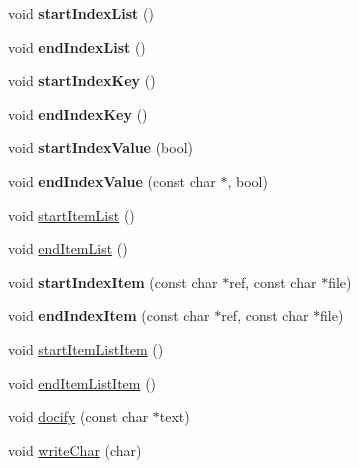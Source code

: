 \begin{DoxyCompactItemize}
void {\bfseries start\+Index\+List} ()
\item 
\mbox{\label{class_docbook_generator_af69c69875e18eba42abc65d88da3a8a5}} 
void {\bfseries end\+Index\+List} ()
\item 
\mbox{\label{class_docbook_generator_ac5012fc0e24ac8f1d65944ef72208311}} 
void {\bfseries start\+Index\+Key} ()
\item 
\mbox{\label{class_docbook_generator_af882cc6b2978a2eea0a83c8e59a5f0ee}} 
void {\bfseries end\+Index\+Key} ()
\item 
\mbox{\label{class_docbook_generator_a495102aee43b7bd5a9ebd4aad9ed9e8a}} 
void {\bfseries start\+Index\+Value} (bool)
\item 
\mbox{\label{class_docbook_generator_acb7e9a3b585b05c467dbedc5c7ce2949}} 
void {\bfseries end\+Index\+Value} (const char $\ast$, bool)
\item 
void \mbox{\hyperlink{class_docbook_generator_addaf6b46396259a8bbebe7b1e9716bc0}{start\+Item\+List}} ()
\item 
void \mbox{\hyperlink{class_docbook_generator_a5e463c37de0b0473855605fe5cf44071}{end\+Item\+List}} ()
\item 
\mbox{\label{class_docbook_generator_ad9b5a8f2d9c1b9702478b2217fe9860f}} 
void {\bfseries start\+Index\+Item} (const char $\ast$ref, const char $\ast$file)
\item 
\mbox{\label{class_docbook_generator_aa8c673bc2d2f1f1a1ec6f25050d5b6e9}} 
void {\bfseries end\+Index\+Item} (const char $\ast$ref, const char $\ast$file)
\item 
void \mbox{\hyperlink{class_docbook_generator_a2ee84d2ec43dc1634a71ee3101eab3e4}{start\+Item\+List\+Item}} ()
\item 
void \mbox{\hyperlink{class_docbook_generator_a6a0d36a22a9ca268b716cd37a4ab13b0}{end\+Item\+List\+Item}} ()
\item 
void \mbox{\hyperlink{class_docbook_generator_a78cc7c7199538d0f38d2696443ca71bf}{docify}} (const char $\ast$text)
\item 
void \mbox{\hyperlink{class_docbook_generator_ab075c899a62994272a1f542404ec614d}{write\+Char}} (char)

\end{DoxyCompactItemize}
